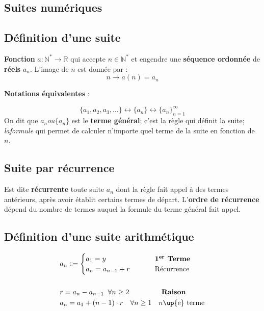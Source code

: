 \documentclass{report}
\begin{document}
\begin{multicols*}{3}
    \footnotesize

    \chapter{Suites numériques}
    \section{Définition d'une suite}
        \textbf{Fonction} $a \colon \mathbb{N}^* 
        \rightarrow \mathbb{R}$ qui accepte 
        $n \in \mathbb{N}^*$ et engendre une \textbf{séquence ordonnée} de 
        \textbf{réels} $a_n$. L'image de $n$ est donnée par :
        \[%
           n \rightarrow a(n) = a_n 
        \]%
        \begin{center}
        \textbf{Notations équivalentes} :    
        \end{center}
        \[%
            \{a_1, a_2, a_3,\dots\} \leftrightarrow  \{ a_n \} 
                            \leftrightarrow  \{a_n\}_{ n = 1}^{\infty }
        \]%
        On dit que $a_n ou \{a_n\}$ est le \textbf{terme général}; c'est la 
        règle qui définit la suite; \textit{laformule}  qui permet de calculer 
        n'importe quel terme de la suite en fonction de $n$. 

    \vspace{-1em}
    \section{Suite par récurrence}
    Est dite \textbf{récurrente} toute suite $a_n$ dont la 
    règle fait appel à des termes antérieurs, après avoir 
    établit certains termes de départ. L'\textbf{ordre de récurrence}
    dépend du nombre de termes auquel la formule du terme général 
    fait appel.

    \section{Définition d'une suite arithmétique}    
    \vspace{-1em}
    \vspace{-1em}
    \begin{align*}
        &a_n \Coloneqq 
        \begin{cases}
            a_1 = y & \hspace{2.5em} \textbf{1\textsuperscript{er} Terme}\\  
            a_{n} = a_{n-1} + r & \hspace{2.5em} \text{Récurrence}
        \end{cases}
        \\\\
        &r = a_n - a_{n-1} \;\; \forall n \geq 2  
        \quad\quad\quad\quad\;\;%
        \textbf{\hfill Raison}  
        \\
        &a_n = a_1 + \left(n - 1\right) \cdot r \quad \forall n \geq 1 
        \quad 
        \text{$n$\up{e} terme} \\
    \end{align*}


\end{multicols*}
\end{document}
